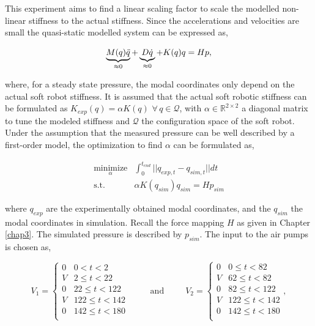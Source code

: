 This experiment aims to find a linear scaling factor to scale the modelled non-linear stiffness to the actual stiffness. Since the accelerations and velocities are small the quasi-static modelled system can be expressed as,

\begin{equation}
   \underbrace{M(q) \Ddot{q}}_{\approx 0} + \underbrace{D \dot{q}}_{\approx 0} + K(q) q = Hp,
\end{equation}

where, for a steady state pressure, the modal coordinates only depend on the actual soft robot stiffness. It is assumed that the actual soft robotic stiffness can be formulated as $K_{exp}(q) = \alpha K(q) \hspace{4pt} \forall \hspace{2pt} q \in \mathcal{Q}$, with $\alpha \in \mathbb{R}^{2\times 2}$ a diagonal matrix to tune the modeled stiffness and $\mathcal{Q}$ the configuration space of the soft robot. Under the assumption that the measured pressure can be well described by a first-order model, the optimization to find $\alpha$ can be formulated as, 

\begin{equation}
\begin{split}
    \underset{\alpha}{\text{minimize}}&\int_0^{t_{end}}||q_{exp,t} - q_{sim,t}||dt  \\
    \text{s.t.} \hspace{10pt} & \alpha K(q_{sim}) q_{sim} = Hp_{sim}
    \end{split}
    \label{eq5:optalpha}
\end{equation}

where $q_{exp}$ are the experimentally obtained modal coordinates, and the $q_{sim}$ the modal coordinates in simulation. Recall the force mapping $H$ as given in Chapter \ref{chap3}. The simulated pressure is described by $p_{sim}$. The input to the air pumps is chosen as,

\begin{equation}
    V_1 =
\begin{cases}
0 & 0 < t < 2\\
V & 2 \leq t < 22\\
0 & 22 \leq t < 122\\
V & 122 \leq t < 142\\
0 & 142 \leq t < 180\\
\end{cases} \hspace{30pt} \text{and} \hspace{30pt}      V_2 =
\begin{cases}
0 & 0 \leq t < 82\\
V & 62 \leq t < 82\\
0 & 82 \leq t < 122\\
V & 122 \leq t < 142\\
0 & 142 \leq t < 180\\
\end{cases} ,
\end{equation}

